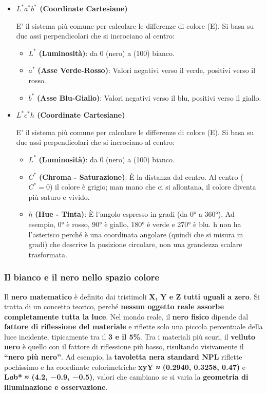 \documentclass[
]{article}
\providecommand{\tightlist}{%
  \setlength{\itemsep}{0pt}\setlength{\parskip}{0pt}}
\begin{document}
\begin{itemize}
\item
  \textbf{\(L^* a^* b^*\) (Coordinate Cartesiane)}

  E' il sistema più comune per calcolare le differenze di colore (\Delta E). Si basa su due assi perpendicolari che si incrociano al centro:

  \begin{itemize}
  \tightlist
  \item
    \(L^*\) \textbf{(Luminosità)}: da 0 (nero) a (100) bianco.
  \item
    \(a^*\) \textbf{(Asse Verde-Rosso)}: Valori negativi verso il verde, positivi verso il rosso.
  \item
    \(b^*\) \textbf{(Asse Blu-Giallo)}: Valori negativi verso il blu, positivi verso il giallo.
  \end{itemize}
\item
  \textbf{\(L^* c^* h\) (Coordinate Cartesiane)}

  E' il sistema più comune per calcolare le differenze di colore (\Delta E). Si basa su due assi perpendicolari che si incrociano al centro:

  \begin{itemize}
  \tightlist
  \item
    \(L^*\) \textbf{(Luminosità)}: da 0 (nero) a (100) bianco.
  \item
    \(C^*\) \textbf{(Chroma - Saturazione)}: È la distanza dal centro. Al centro (\(C^* = 0\)) il colore è grigio; man mano che ci si allontana, il colore diventa più saturo e vivido.
  \item
    \(h\) \textbf{(Hue - Tinta)}: È l'angolo espresso in gradi (da 0° a 360°). Ad esempio, 0° è rosso, 90° è giallo, 180° è verde e 270° è blu.
    h non ha l'asterisco perché è una coordinata angolare (quindi che si misura in gradi) che descrive la posizione circolare, non una grandezza scalare trasformata.
  \end{itemize}
\end{itemize}

\hypertarget{il-bianco-e-il-nero-nello-spazio-colore}{%
\subsubsection{Il bianco e il nero nello spazio colore}\label{il-bianco-e-il-nero-nello-spazio-colore}}

Il \textbf{nero matematico} è definito dai tristimoli \textbf{X, Y e Z tutti uguali a zero}. Si tratta di un concetto teorico, perché \textbf{nessun oggetto reale assorbe completamente tutta la luce}. Nel mondo reale, il \textbf{nero fisico} dipende dal \textbf{fattore di riflessione del materiale} e riflette solo una piccola percentuale della luce incidente, tipicamente tra il \textbf{3 e il 5\%}. Tra i materiali più scuri, il \textbf{velluto nero} è quello con il fattore di riflessione più basso, risultando visivamente il \textbf{``nero più nero''}. Ad esempio, la \textbf{tavoletta nera standard NPL} riflette pochissimo e ha coordinate colorimetriche \textbf{xyY ≈ (0.2940, 0.3258, 0.47)} e \textbf{L\emph{a}b* ≈ (4.2, −0.9, −0.5)}, valori che cambiano se si varia la \textbf{geometria di illuminazione e osservazione}.
\end{document}
